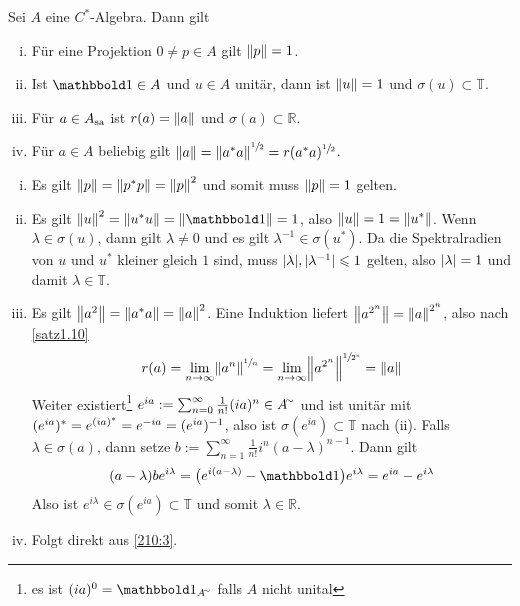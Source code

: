 \begin{proposition}[label=prop:210,{name=[Eigenschaften von Projektionen, unitären und selbstadjungierten Elementen]}]
	Sei $A$ eine $C^*$-Algebra. Dann gilt
	\begin{enumerate}[(i),itemsep=0pt]
		\item Für eine Projektion $0 \neq p  \in A$ gilt $\norm*{p} =1$.
		\item Ist $\ind \in A$ und $u \in A$ unitär, dann ist $\norm*{u}=1$ und $\sigma(u) \subset \mathbb{T}$.
		\item \label{210:3} Für $a \in A_{\sa}$ ist $r(a)= \norm*{a}$ und $\sigma(a) \subset \mathbb{R}$.
		\item Für $a \in A$ beliebig gilt $\norm*{a} = \norm*{a^* a}^{\sfrac{1}{2}}= r(a^* a)^{\sfrac{1}{2}}$.
	\end{enumerate}
\end{proposition}
\begin{beweis}
	\leavevmode
	\begin{enumerate}[(i),itemsep=0pt]
		\item Es gilt $\norm*{p} = \norm*{p^*p}= \norm*{p}^2$ und somit muss $\norm*{p}=1$ gelten.
		\item Es gilt $\norm*{u}^2= \norm*{u^* u}= \norm*{\ind}=1$, also $\norm*{u}=1=\norm*{u^*}$. Wenn $\lambda \in \sigma(u)$, dann gilt $\lambda \neq 0$ und es gilt
		$\lambda^{-1} \in \sigma(u^*)$. Da die Spektralradien von $u$ und $u^*$ kleiner gleich $1$ sind, muss $\abs{\lambda},\abs{\lambda^{-1}}\le 1$ gelten, also $\abs{\lambda}=1$
		und damit $\lambda \in \mathbb{T}$.
		\item Es gilt $\norm*{a^2}= \norm*{a^* a}= \norm*{a}^2$. Eine Induktion liefert $\norm*{a^{2^n}}= \norm*{a}^{2^n}$, also nach \autoref{satz1.10} 
		\[
			r(a) = \lim_{n \to \infty} \norm*{a^n}^{\sfrac{1}{n}} = \lim_{n \to \infty} \norm*{a^{2^n}}^{\sfrac{1}{2^n}} = \norm*{a}
		\]
		Weiter existiert\footnote{es ist $(ia)^0 = \ind_{A^\simm}$ falls $A$ nicht unital} $e^{ia} := \sum_{n=0}^{\infty} \frac{1}{n!}(ia)^n \in A^\simm$ und ist unitär mit 
		\(
			\enbrace{e^{ia}}^* = e^{(ia)^*} = e^{-ia} = \enbrace{e^{ia}}^{-1}
		\), 
		also ist $\sigma(e^{ia}) \subset \mathbb{T}$ nach (ii). Falls $\lambda \in \sigma(a)$, dann setze $b := \sum_{n=1}^{\infty} \frac{1}{n!} i^n (a-\lambda)^{n-1}$. Dann gilt
		\[
			(a-\lambda) b e^{i \lambda} = \enbrace[\big]{e^{i(a-\lambda)}- \ind}e^{i \lambda} = e^{i a} - e^{i \lambda}
		\]
		Also ist $e^{i \lambda} \in \sigma(e^{ia}) \subset \mathbb{T}$ und somit $\lambda \in \mathbb{R}$.
		\item Folgt direkt aus \ref{210:3}. \qedhere
	\end{enumerate}
\end{beweis}

